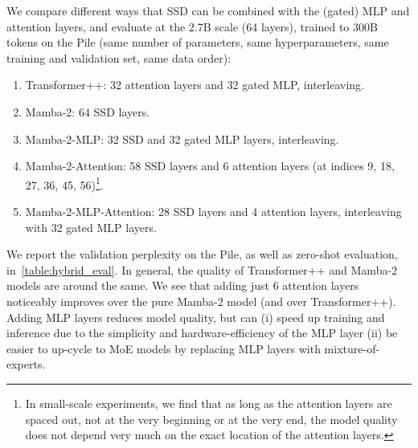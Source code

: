 We compare different ways that SSD can be combined with the (gated) MLP and attention layers, and evaluate at the 2.7B scale (64 layers), trained to 300B tokens on the Pile (same
number of parameters, same hyperparameters, same training and validation set, same data order):
\begin{enumerate}
\item Transformer++: 32 attention layers and 32 gated MLP, interleaving.
\item Mamba-2: 64 SSD layers.
\item Mamba-2-MLP: 32 SSD and 32 gated MLP layers, interleaving.
\item Mamba-2-Attention: 58 SSD layers and 6 attention layers (at indices 9, 18, 27, 36, 45, 56)\footnote{In small-scale experiments, we find that as long as the attention layers are spaced out, not at the very beginning or at the very end, the model quality does not depend very much on the exact location of the attention layers.}.
\item Mamba-2-MLP-Attention: 28 SSD layers and 4 attention layers, interleaving with 32 gated MLP layers.
\end{enumerate}
We report the validation perplexity on the Pile, as well as zero-shot evaluation, in~\cref{table:hybrid_eval}.
In general, the quality of Transformer++ and Mamba-2 models are around the same.
We see that adding just 6 attention layers noticeably improves over the pure Mamba-2 model (and over Transformer++). Adding MLP layers reduces model quality, but can (i) speed up training and inference due to the simplicity and hardware-efficiency of the MLP layer (ii) be easier to up-cycle to MoE models by replacing MLP layers with mixture-of-experts.
